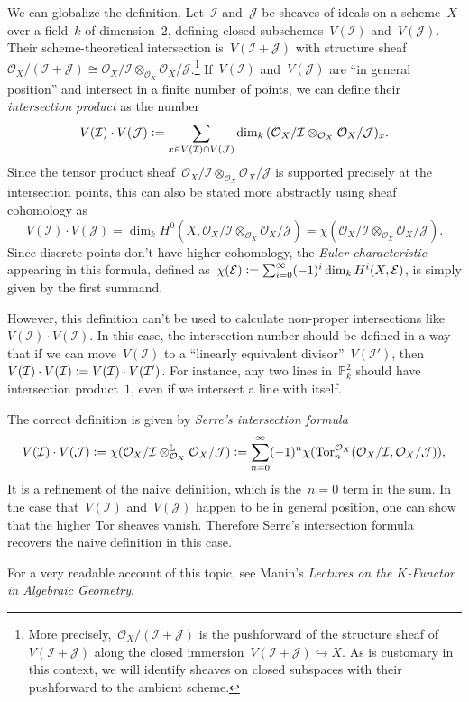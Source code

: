 \documentclass{amsart}
\newcommand*{\sectionsummary}[1]{\etoctoccontentsline{sectionsummary}{#1}}
\theoremstyle{definition}
\theoremstyle{plain}
\theoremstyle{remark}
\newcommand{\C}{\mathcal{C}}
\newcommand{\E}{\mathcal{E}}
\renewcommand{\O}{\mathcal{O}}
\newcommand{\I}{\mathcal{I}}
\newcommand{\J}{\mathcal{J}}
\newcommand{\RR}{\mathbb{R}}
\newcommand{\LL}{\mathbb{L}}
\newcommand{\PP}{\mathbb{P}}
\newcommand{\Tor}{\mathrm{Tor}}
\newcommand{\?}{\,{:}\,}
\renewcommand{\_}{\mathpunct{.}\,}
\newcommand{\ip}{\cdot}
\newcommand{\defeq}{\vcentcolon=}
\begin{document}
We can globalize the definition. Let~$\I$ and~$\J$ be sheaves of ideals on a
scheme~$X$ over a field~$k$ of dimension~$2$, defining closed
subschemes~$V(\I)$ and~$V(\J)$.  Their scheme-theoretical intersection is~$V(\I
+ \J)$ with structure sheaf~$\O_X/(\I + \J) \cong \O_X/\I \otimes_{\O_X}
\O_X/\J$.\footnote{More precisely,~$\O_X/(\I + \J)$ is the pushforward of the
structure sheaf of~$V(\I + \J)$ along the closed immersion~$V(\I + \J)
\hookrightarrow X$. As is customary in this context, we will identify sheaves
on closed subspaces with their pushforward to the ambient scheme.} If~$V(\I)$
and~$V(\J)$ are ``in general position'' and intersect in a finite number of
points, we can define their \emph{intersection product} as the number
\[ V(\I) \ip V(\J) \defeq \sum_{x \in V(\I) \cap V(\J)}
  \dim_k\, (\O_X/\I \otimes_{\O_X} \O_X/\J)_x. \]
Since the tensor product sheaf~$\O_X/\I \otimes_{\O_X} \O_X/\J$ is supported
precisely at the intersection points, this can also be stated more abstractly
using sheaf cohomology as
\[ V(\I) \ip V(\J) = \dim_k H^0(X, \O_X/\I \otimes_{\O_X} \O_X/\J) =
\chi(\O_X/\I \otimes_{\O_X} \O_X/\J). \]
Since discrete points don't have higher cohomology, the \emph{Euler
characteristic} appearing in this formula, defined as~$\chi(\E) \defeq
\sum_{i=0}^\infty (-1)^i \dim_k H^i(X, \E)$, is simply given by the first
summand.

However, this definition can't be used to calculate non-proper intersections
like $V(\I) \ip V(\I)$. In this case, the intersection number should be defined in a way that if we can
move~$V(\I)$ to a ``linearly equivalent divisor''~$V(\I')$, then~$V(\I) \ip
V(\I) \defeq V(\I) \ip V(\I')$. For instance, any two lines in~$\PP^2_k$ should
have intersection product~$1$, even if we intersect a line with itself.

The correct definition is given by \emph{Serre's intersection formula}
\[ V(\I) \ip V(\J) \defeq \chi(\O_X/\I \otimes^\LL_{\O_X} \O_X/\J) \defeq
  \sum_{n=0}^\infty (-1)^n \chi(\Tor_n^{\O_X}(\O_X/\I,\O_X/\J)), \]
It is a refinement of the naive definition, which is the~$n = 0$ term in the
sum. In the case that~$V(\I)$ and~$V(\J)$ happen to be in general position, one can
show that the higher Tor sheaves vanish. Therefore Serre's intersection formula
recovers the naive definition in this case.

For a very readable account of this topic, see Manin's \emph{Lectures on the
$K$-Functor in Algebraic Geometry}.

%
\end{document}
